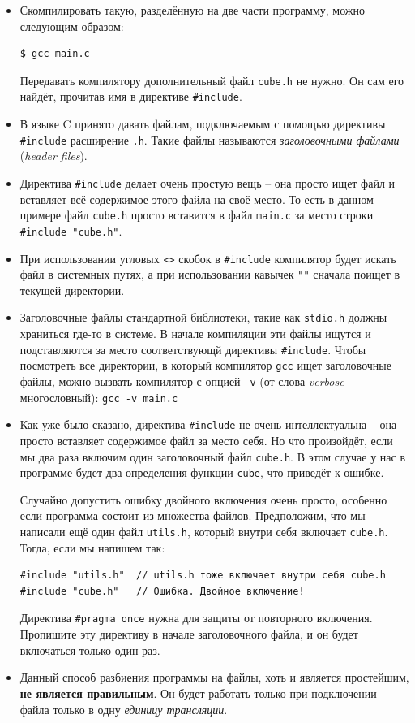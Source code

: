 \documentclass[10pt]{article}
\begin{document}
\begin{itemize}
\item Скомпилировать такую, разделённую на две части программу, можно следующим образом:
\begin{lstlisting}
$ gcc main.c
\end{lstlisting}
Передавать компилятору дополнительный файл \texttt{cube.h} не нужно. Он сам его найдёт, прочитав имя в директиве \texttt{\#include}.

\item В языке C принято давать файлам, подключаемым с помощью директивы \texttt{\#include} расширение \texttt{.h}. Такие файлы называются \textit{заголовочными файлами} (\textit{header files}).
\item Директива \texttt{\#include} делает очень простую вещь -- она просто ищет файл и вставляет всё содержимое этого файла на своё место. То есть в данном примере файл \texttt{cube.h} просто вставится в файл \texttt{main.c} за место строки \texttt{\#include "cube.h"}.
\item При использовании угловых \texttt{<>} скобок в \texttt{\#include} компилятор будет искать файл в системных путях, а при использовании кавычек \texttt{"{}"} сначала поищет в текущей директории.
\item Заголовочные файлы стандартной библиотеки, такие как \texttt{stdio.h} должны храниться где-то в системе. В начале компиляции эти файлы ищутся и подставляются за место соответствующй директивы \texttt{\#include}. Чтобы посмотреть все директории, в который компилятор \texttt{gcc} ищет заголовочные файлы, можно вызвать компилятор с опцией \texttt{-v} (от слова \textit{verbose} - многословный): \texttt{gcc -v main.c}

\item Как уже было сказано, директива \texttt{\#include} не очень интеллектуальна -- она просто вставляет содержимое файл за место себя. Но что произойдёт, если мы два раза включим один заголовочный файл \texttt{cube.h}. В этом случае у нас в программе будет два определения функции \texttt{cube}, что приведёт к ошибке.

Случайно допустить ошибку двойного включения очень просто, особенно если программа состоит из множества файлов. Предположим, что мы написали ещё один файл \texttt{utils.h}, который внутри себя включает \texttt{cube.h}. Тогда, если мы напишем так:
\begin{lstlisting}
#include "utils.h"  // utils.h тоже включает внутри себя cube.h
#include "cube.h"   // Ошибка. Двойное включение!
\end{lstlisting}
Директива \texttt{\#pragma once} нужна для защиты от повторного включения. Пропишите эту директиву в начале заголовочного файла, и он будет включаться только один раз.

\item Данный способ разбиения программы на файлы, хоть и является простейшим, \textbf{не является правильным}. Он будет работать только при подключении файла только в одну \textit{единицу трансляции}.

\end{itemize}
\end{document}

